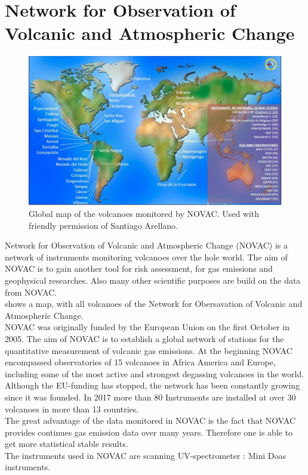 \documentclass  [
  paper    = a4,
  BCOR     = 10mm,
  twoside,
  fontsize = 12pt,
  fleqn,
  toc      = bibnumbered,
  toc      = listofnumbered,
  numbers  = noendperiod,
  headings = normal,
  listof   = leveldown,
  version  = 3.03
]                                       {scrreprt}
\begin{document}
	\chapter{Network for Observation of Volcanic and Atmospheric Change \label{NOVAC}}
		\begin{figure}[h]
			\centering
			\includegraphics[width=0.8\linewidth]{Bilder/NOVAC2015}
			\caption{Global map of the volcanoes monitored by NOVAC. Used with friendly permission of Santiago Arellano.}
			\label{fig:novac2015}
		\end{figure}
		Network for Observation of Volcanic and Atmospheric Change (NOVAC) is a network of instruments monitoring volcanoes over the hole world. 
		The aim of NOVAC is to gain another tool for risk assessment, for gas emissions and geophysical researches. Also many other scientific purposes are build on the data from NOVAC.\\
		 shows a map, with all volcanoes of the Network for Obersavation of Volcanic and Atmospheric Change.\\
		NOVAC was originally funded by the European Union on the first October in 2005. The aim of NOVAC is to  establish  a  global  
		network  of  stations  for  the  quantitative  measurement  of  volcanic gas  emissions. At the beginning NOVAC encompassed observatories of 15 volcanoes in Africa America and Europe, including some of the most active and strongest degassing volcanoes in the world. Although the EU-funding has stopped, the network has been constantly growing since it was founded. In 2017 more than 80 Instruments are installed at over 30 volcanoes in more than 13 countries.\\
		The great advantage of the data monitored in NOVAC is the fact
		that NOVAC provides continues gas emission data over many years. Therefore one is able to get more statistical stable results.\\
		The instruments used in NOVAC are scanning UV-spectrometer : Mini Doas instruments. \\
\end{document}
